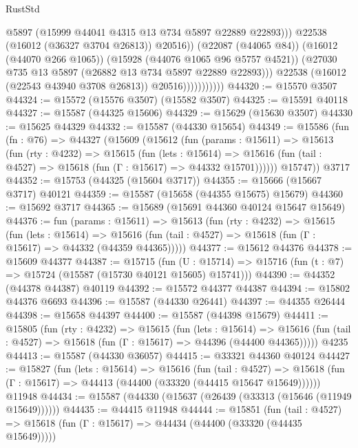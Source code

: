 \begin{lexlean}{RustStd}
\begin{coremodule}
                                    @5897
                                    (@15999 @44041 @4315 @13 @734 @5897 @22889 @22893)))
                                @22538
                                (@16012 (@36327 @3704 @26813))
                                @20516))
                            (@22087 (@44065 @84))
                            (@16012 (@44070 @266 @1065))
                            (@15928 (@44076 @1065 @96 @5757 @4521))
                            (@27030 @735 @13 @5897 (@26882 @13 @734 @5897 @22889 @22893)))
                          @22538
                          (@16012 (@22543 @43940 @3708 @26813))
                          @20516)))))))))))
@44320 := @15570 @3507
@44324 := @15572 (@15576 @3507) (@15582 @3507)
@44325 := @15591 @40118
@44327 := @15587 (@44325 @15606)
@44329 := @15629 (@15630 @3507)
@44330 := @15625 @44329
@44332 := @15587 (@44330 @15654)
@44349 := @15586
    (fun (fn : @76) =>
    @44327
      (@15609
        (@15612
          (fun (params : @15611) =>
          @15613
            (fun (rty : @4232) =>
            @15615
              (fun (lets : @15614) =>
              @15616 (fun (tail : @4527) => @15618 (fun (Γ : @15617) => @44332 @15701))))))
        @15747))
    @3717
@44352 := @15753 (@44325 (@15604 @3717))
@44355 := @15666 (@15667 @3717) @40121
@44359 := @15587 (@15658 (@44355 @15675) @15679)
@44360 := @15692 @3717
@44365 := @15689 (@15691 @44360 @40124 @15647 @15649)
@44376 := fun (params : @15611) =>
  @15613
    (fun (rty : @4232) =>
    @15615
      (fun (lets : @15614) =>
      @15616 (fun (tail : @4527) => @15618 (fun (Γ : @15617) => @44332 (@44359 @44365)))))
@44377 := @15612 @44376
@44378 := @15609 @44377
@44387 := @15715
    (fun (U : @15714) => @15716 (fun (t : @7) => @15724 (@15587 (@15730 @40121 @15605) @15741)))
@44390 := @44352 (@44378 @44387) @40119
@44392 := @15572 @44377 @44387
@44394 := @15802 @44376 @6693
@44396 := @15587 (@44330 @26441)
@44397 := @44355 @26444
@44398 := @15658 @44397
@44400 := @15587 (@44398 @15679)
@44411 := @15805
    (fun (rty : @4232) =>
    @15615
      (fun (lets : @15614) =>
      @15616 (fun (tail : @4527) => @15618 (fun (Γ : @15617) => @44396 (@44400 @44365)))))
    @4235
@44413 := @15587 (@44330 @36057)
@44415 := @33321 @44360 @40124
@44427 := @15827
    (fun (lets : @15614) =>
    @15616
      (fun (tail : @4527) =>
      @15618 (fun (Γ : @15617) => @44413 (@44400 (@33320 (@44415 @15647 @15649))))))
    @11948
@44434 := @15587 (@44330 (@15637 (@26439 (@33313 (@15646 (@11949 @15649))))))
@44435 := @44415 @11948
@44444 := @15851
    (fun (tail : @4527) => @15618 (fun (Γ : @15617) => @44434 (@44400 (@33320 (@44435 @15649)))))

\end{coremodule}
\end{lexlean}
